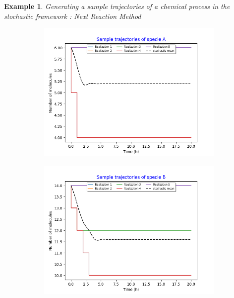 \documentclass[11pt,a4paper]{article}
\newtheorem{example}[theorem]{Example}
\begin{document}
\begin{example}{Generating a sample trajectories of a chemical process in the stochastic framework : Next Reaction Method}
    \begin{figure}[H]
    \centering
    \begin{subfigure}{.5\textwidth}
      \centering
        \includegraphics[width=1.1\linewidth]{Images/a.png}
        \label{fig: Single sample trajectory}
    \end{subfigure}%
    \begin{subfigure}{.5\textwidth}
      \centering
        \includegraphics[width=1.1\linewidth]{Images/b.png}
        \label{fig: Single sample trajectory}
    \end{subfigure}

\end{figure}
\end{example}
\end{document}

